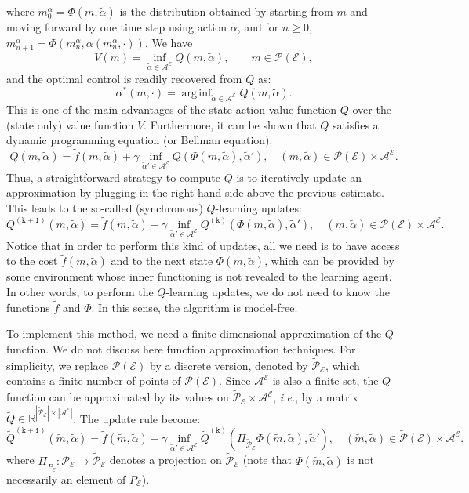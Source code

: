 \documentclass{amsproc}
\theoremstyle{definition}
\theoremstyle{remark}
\numberwithin{equation}{section}
\newcommand{\RR}{{\mathbb R}}
\newcommand{\cA}{{\mathcal A}}
\newcommand{\cE}{{\mathcal E}}
\newcommand{\cP}{{\mathcal P}}
\newcommand{\ctrl}{\alpha}
\DeclareMathOperator*{\arginf}{arg\,inf}
\begin{document}
 where $m^\ctrl_0 = \Phi(m, \tilde\ctrl)$ is the distribution obtained by starting from $m$ and moving forward by one time step using action $\tilde\ctrl$, and for $n \ge 0$, $m^\ctrl_{n+1} = \Phi(m^\ctrl_{n}, \ctrl(m^\ctrl_{n},\cdot))$. We have
 \begin{equation}
 \label{eq:MFCQ-link-VQ}
 	V(m) = \inf_{\tilde\ctrl \in \cA^{\cE}} Q(m, \tilde\ctrl), \qquad m \in \cP(\cE),
 \end{equation}
 and the optimal control is readily recovered from $Q$ as: 
\begin{equation}
 \label{eq:MFCQ-link-ctrloptQ}
 	\ctrl^*(m,\cdot) = \arginf_{\tilde\ctrl \in \cA^{\cE}} Q(m, \tilde\ctrl).
\end{equation}
 This is one of the main advantages of the state-action value function $Q$ over the (state only) value function $V$. 
 Furthermore, it can be shown that $Q$ satisfies a dynamic programming equation (or Bellman equation):
$$
	 Q(m,\tilde\ctrl) = \tilde f(m,\tilde\ctrl) + \gamma \inf_{\tilde\ctrl' \in \cA^{\cE}} Q(\Phi(m, \tilde\ctrl), \tilde\ctrl'), \quad (m,\tilde\ctrl) \in \cP(\cE) \times \cA^{\cE}.
$$
Thus, a straightforward strategy to compute $Q$ is to iteratively update an approximation by plugging in the right hand side above the previous estimate. This leads to the so-called (synchronous) $Q$-learning updates:
\begin{equation}
\label{eq:MFC-Q-updates}
	 Q^{(\mathtt{k+1})}(m,\tilde\ctrl) = \tilde f(m,\tilde\ctrl) + \gamma \inf_{\tilde\ctrl' \in \cA^{\cE}} Q^{(\mathtt{k})}(\Phi(m, \tilde\ctrl), \tilde\ctrl'), \quad (m,\tilde\ctrl) \in \cP(\cE) \times \cA^{\cE}.
\end{equation}
Notice that in order to perform this kind of updates, all we need is to have access to the cost $\tilde f(m,\tilde\ctrl)$ and to the next state $\Phi(m, \tilde\ctrl)$, which can be provided by some environment whose inner functioning is not revealed to the learning agent. In other words, to perform the $Q$-learning updates, we do not need to know the functions $\tilde f$ and $\Phi$. In this sense, the algorithm is model-free.

To implement this method, we need a finite dimensional approximation of the $Q$ function. We do not discuss here function approximation techniques. For simplicity, we replace $\cP(\cE)$ by a discrete version, denoted by $\tilde\cP_\cE$, which contains a finite number of points of $\cP(\cE)$. Since $\cA^\cE$ is also a finite set, the $Q$-function can be approximated by its values on $\tilde\cP_\cE \times \cA^\cE$, \textit{i.e.}, by a matrix $\tilde Q \in \RR^{|\tilde\cP_\cE| \times |\cA^\cE|}$. The update rule become:
\begin{equation}
\label{eq:MFC-Q-updates-proj}
	 \tilde Q^{(\mathtt{k+1})}(\tilde m,\tilde\ctrl) = \tilde f(\tilde m,\tilde\ctrl) + \gamma \inf_{\tilde\ctrl' \in \cA^{\cE}} \tilde Q^{(\mathtt{k})}(\Pi_{\tilde \cP_\cE} \Phi(\tilde m, \tilde\ctrl), \tilde\ctrl'), \quad (\tilde m, \tilde\ctrl) \in \tilde\cP(\cE) \times \cA^{\cE}.
\end{equation}
where $\Pi_{\tilde P_\cE}: \cP_\cE \to \tilde \cP_\cE$ denotes a projection on $\tilde\cP_\cE$ (note that $\Phi(\tilde m, \tilde\ctrl)$ is not necessarily an element of $\tilde P_\cE$). 
\end{document}
